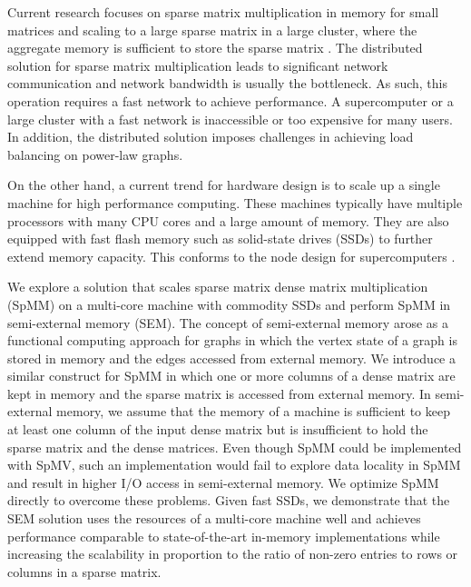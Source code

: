 Current research focuses on sparse matrix multiplication in memory
for small matrices and scaling to a large sparse matrix in a large cluster,
where the aggregate memory is sufficient to store the sparse matrix
\cite{Williams07, Yoo11, Boman2013}.
The distributed solution for sparse matrix multiplication leads to significant
network communication and network bandwidth is usually the bottleneck.
As such, this operation requires a fast network to achieve performance.
A supercomputer or a large cluster with a fast network is inaccessible or
too expensive for many users. In addition, the distributed solution imposes
challenges in achieving load balancing on power-law graphs.


On the other hand, a current trend for hardware design is to scale up
a single machine for high performance computing.
These machines typically have multiple processors with many CPU cores and
a large amount of memory. They are also equipped with fast flash
memory such as solid-state drives (SSDs) to further extend memory capacity.
This conforms to the node design for supercomputers \cite{Ang14}.

We explore a solution that scales sparse matrix dense matrix multiplication
(SpMM) on a multi-core machine with commodity SSDs and
perform SpMM in semi-external memory (SEM). The concept of semi-external memory
arose as a functional computing approach for graphs \cite{Abello98} in which
the vertex state of a graph is stored in memory and the edges accessed from
external memory. We introduce a similar construct for SpMM in which one or more
columns of a dense matrix are kept in memory and the sparse matrix is accessed
from external memory. In semi-external memory, we assume
that the memory of a machine is sufficient to keep at least one column
of the input dense matrix but is insufficient to hold the sparse matrix
and the dense matrices. Even though SpMM could be implemented with
SpMV, such an implementation would fail to explore data locality in SpMM and
result in higher I/O access in semi-external memory. We optimize SpMM directly
to overcome these problems. Given fast SSDs, we demonstrate that the SEM
solution uses the resources of a multi-core machine well and
achieves performance comparable to state-of-the-art in-memory implementations
while increasing the scalability in proportion
to the ratio of non-zero entries to rows or columns in a sparse matrix.


